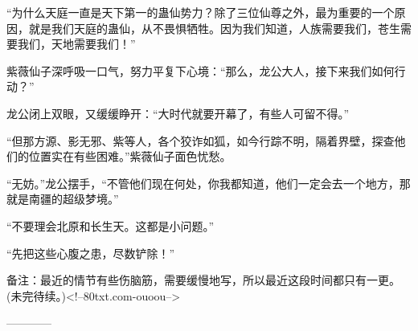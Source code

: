 \begin{this_body}
“为什么天庭一直是天下第一的蛊仙势力？除了三位仙尊之外，最为重要的一个原因，就是我们天庭的蛊仙，从不畏惧牺牲。因为我们知道，人族需要我们，苍生需要我们，天地需要我们！”

紫薇仙子深呼吸一口气，努力平复下心境：“那么，龙公大人，接下来我们如何行动？”

龙公闭上双眼，又缓缓睁开：“大时代就要开幕了，有些人可留不得。”

“但那方源、影无邪、紫等人，各个狡诈如狐，如今行踪不明，隔着界壁，探查他们的位置实在有些困难。”紫薇仙子面色忧愁。

“无妨。”龙公摆手，“不管他们现在何处，你我都知道，他们一定会去一个地方，那就是南疆的超级梦境。”

“不要理会北原和长生天。这都是小问题。”

“先把这些心腹之患，尽数铲除！”

备注：最近的情节有些伤脑筋，需要缓慢地写，所以最近这段时间都只有一更。(未完待续。)<!--80txt.com-ouoou-->

------------

\end{this_body}

